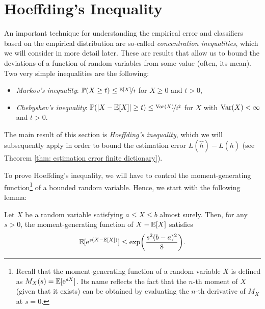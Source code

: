 \section{Hoeffding's Inequality}

An important technique for understanding the empirical error and classifiers based on the empirical distribution are so-called \emph{concentration inequalities}, which we will consider in more detail later. These are results that allow us to bound the deviations of a function of random variables from some value (often, its mean). Two very simple inequalities are the following:

\begin{prop}
\begin{itemize}
    \item \emph{Markov's inequality}: $\mathbb{P}(X \geq t) \leq \nicefrac{\operatorname{\mathbb{E}}[X]}{t}$ for $X \geq 0$ and $t > 0$,

    \item \emph{Chebyshev’s inequality}: $\mathbb{P}(\abs{X - \operatorname{\mathbb{E}}[X]} \geq t) \leq \nicefrac{\operatorname{Var}(X)}{t^2}$ for $X$ with $\operatorname{Var}(X) < \infty$ and $t > 0$.
\end{itemize}
\end{prop}

\noindent The main result of this section is \emph{Hoeffding's inequality}, which we will subsequently apply in order to bound the estimation error $L(\hat{h}) - L(\bar{h})$ (see Theorem \ref{thm: estimation error finite dictionary}).

To prove Hoeffding's inequality, we will have to control the moment-generating function\footnote{Recall that the moment-generating function of a random variable $X$ is defined as $M_X(s) = \operatorname{\mathbb{E}}[\mathrm{e}^{sX}]$. Its name reflects the fact that the $n$-th moment of $X$ (given that it exists) can be obtained by evaluating the $n$-th derivative of $M_X$ at $s=0$.} of a bounded random variable. Hence, we start with the following lemma:

\begin{lemma}
\label{lem: hoeffding}
Let $X$ be a random variable satisfying $a \leq X \leq b$ almost surely. Then, for any $s > 0$, the moment-generating function of $X - \operatorname{\mathbb{E}}[X]$ satisfies
\[
    \operatorname{\mathbb{E}}[\mathrm{e}^{s(X - \operatorname{\mathbb{E}}[X])}] \leq \exp(\frac{s^2(b - a)^2}{8}).
\]
\end{lemma}

